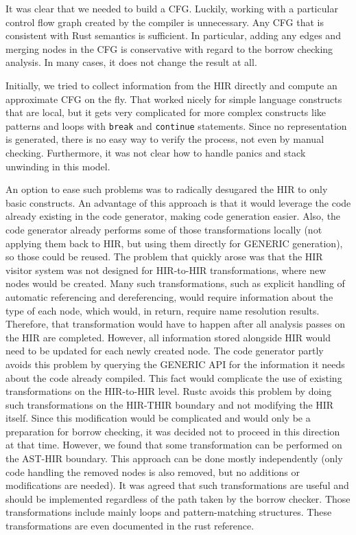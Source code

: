 \documentclass[
  11pt,
  twoside,symmetric]{report}
\begin{document}
It was clear that we needed to build a CFG. Luckily, working with a
particular control flow graph created by the compiler is unnecessary.
Any CFG that is consistent with Rust semantics is sufficient. In
particular, adding any edges and merging nodes in the CFG is
conservative with regard to the borrow checking analysis. In many cases,
it does not change the result at all.

Initially, we tried to collect information from the HIR directly and
compute an approximate CFG on the fly. That worked nicely for simple
language constructs that are local, but it gets very complicated for
more complex constructs like patterns and loops with \texttt{break} and
\texttt{continue} statements. Since no representation is generated,
there is no easy way to verify the process, not even by manual checking.
Furthermore, it was not clear how to handle panics and stack unwinding
in this model.

An option to ease such problems was to radically desugared the HIR to
only basic constructs. An advantage of this approach is that it would
leverage the code already existing in the code generator, making code
generation easier. Also, the code generator already performs some of
those transformations locally (not applying them back to HIR, but using
them directly for GENERIC generation), so those could be reused. The
problem that quickly arose was that the HIR visitor system was not
designed for HIR-to-HIR transformations, where new nodes would be
created. Many such transformations, such as explicit handling of
automatic referencing and dereferencing, would require information about
the type of each node, which would, in return, require name resolution
results. Therefore, that transformation would have to happen after all
analysis passes on the HIR are completed. However, all information
stored alongside HIR would need to be updated for each newly created
node. The code generator partly avoids this problem by querying the
GENERIC API for the information it needs about the code already
compiled. This fact would complicate the use of existing transformations
on the HIR-to-HIR level. Rustc avoids this problem by doing such
transformations on the HIR-THIR boundary and not modifying the HIR
itself. Since this modification would be complicated and would only be a
preparation for borrow checking, it was decided not to proceed in this
direction at that time. However, we found that some transformation can
be performed on the AST-HIR boundary. This approach can be done mostly
independently (only code handling the removed nodes is also removed, but
no additions or modifications are needed). It was agreed that such
transformations are useful and should be implemented regardless of the
path taken by the borrow checker. Those transformations include mainly
loops and pattern-matching structures. These transformations are even
documented in the rust reference.
\end{document}
